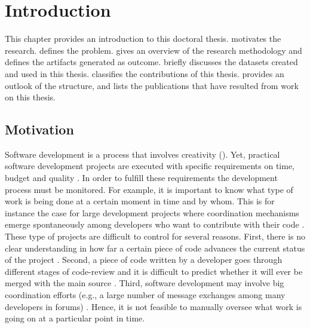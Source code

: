 \chapter{Introduction}
\label{chap:intro} %

This chapter provides an introduction to this doctoral thesis.  motivates the research.  defines the problem.  gives an overview of the research methodology and defines the artifacts generated as outcome.  briefly discusses the datasets created and used in this thesis.  classifies the contributions of this thesis.  provides an outlook of the structure, and  lists the publications that have resulted from work on this thesis. 

\section{Motivation}
\label{sec:intro-motivation}

Software development is a process that involves creativity (\citealp{DBLP:journals/jss/AldaveVGM19,DBLP:journals/jss/DingsoyrNBM12}). Yet, practical software development projects are executed with specific requirements on time, budget and quality \citep{DBLP:journals/jss/ChowC08}. In order to fulfill these requirements the development process must be monitored. For example, it is important to know what type of work is being done at a certain moment in time and by whom. This is for instance the case for large development projects where coordination mechanisms emerge spontaneously among developers who want to contribute with their code \citep{Crowston2005}.
These type of projects are difficult to control for several reasons. First, there is no clear understanding in how far a certain piece of code advances the current status of the project \citep{DBLP:books/daglib/0029843}. Second, a piece of code written by a developer goes through different stages of code-review and it is difficult to predict whether it will ever be merged with the main source \citep{DBLP:conf/icse/SadowskiSCSB18}. Third, software development may involve big coordination efforts (e.g., a large number of message exchanges among many developers in forums) \citep{DBLP:conf/icse/KalliamvakouDBS15}. Hence, it is not feasible to manually oversee what work is going on at a particular point in time. 

